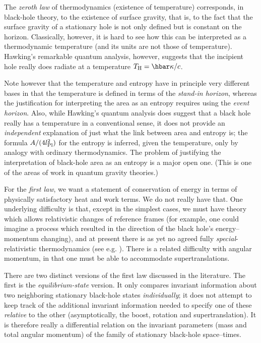 \documentclass[12pt]{article}
\begin{document}
The {\em zeroth law} of thermodynamics (existence of temperature) corresponds, in black-hole theory, to the existence of surface gravity, that is, to the fact that the surface gravity of a stationary hole is not only defined but is constant on the horizon.
Classically, however, it is hard to see how this can be interpreted as a thermodynamic temperature (and its units are not those of temperature).  Hawking's remarkable quantum analysis, however, suggests that the incipient hole really does radiate at a temperature $T_{\rm H}=\hbar \kappa /c$.

Note however that the temperature and entropy
have in principle very
different bases in that the temperature is defined in terms of the {\em stand-in horizon}, whereas the justification for interpreting the area as an entropy requires using the {\em event horizon}.
Also, while Hawking's quantum analysis does suggest that a black hole really has a temperature in a conventional sense, it does not provide an {\em independent} explanation of just what the link between area and entropy is; the formula $A/(4l_{\rm Pl}^2)$ for the entropy is inferred, given the temperature, only by analogy with ordinary thermodynamics.  The problem of justifying the interpretation of black-hole area as an entropy is a major open one.  (This is one of the areas of work in quantum gravity theories.)


For the {\em first law}, we want a statement of conservation of energy in terms of physically satisfactory heat and work terms. 
We do not really have that.  One underlying difficulty is that, except in the simplest cases, we must have theory which allows relativistic changes of reference frames (for example, one could imagine a process which resulted in the direction of the black hole's energy--momentum changing), and
at present there is as yet no agreed fully 
{\em special}-relativistic thermodynamics (see e.g. \citep{DHH:2009}).  There is a related difficulty with angular momentum, in that one must be able to accommodate supertranslations.

There are two distinct versions of the first law discussed in the literature.  The first is the {\em equilibrium-state} version.  It only compares invariant information about two neighboring stationary black-hole states {\em individually}; it does not attempt to keep track of the additional invariant information needed to specify one of these {\em relative} to the other (asymptotically, the boost, rotation and supertranslation).  It is therefore really a differential relation on the invariant parameters (mass and total angular momentum) of the family of stationary black-hole space--times.
\end{document}
